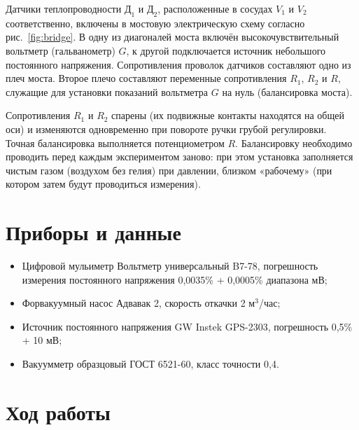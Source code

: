 \documentclass[a4paper,12pt]{article}
\begin{document}
        
        Датчики теплопроводности $\text{Д}_1$ и $\text{Д}_2$, расположенные в сосудах $V_1$ и $V_2$ соответственно, включены в мостовую электрическую схему согласно рис.~\ref{fig:bridge}. В одну из диагоналей моста включён высокочувствительный вольтметр (гальванометр) $G$, к другой подключается источник небольшого постоянного напряжения. Сопротивления проволок датчиков составляют одно из плеч моста. Второе плечо составляют переменные сопротивления $R_1$, $R_2$ и $R$, служащие для установки показаний вольтметра $G$ на нуль (балансировка моста).
        
        Сопротивления $R_1$ и $R_2$ спарены (их подвижные контакты находятся на общей оси) и изменяются одновременно при повороте ручки грубой регулировки. Точная балансировка выполняется потенциометром $R$. Балансировку необходимо проводить перед каждым экспериментом заново: при этом установка заполняется чистым газом (воздухом без гелия) при давлении, близком «рабочему» (при котором затем будут проводиться измерения).

        \section{Приборы и данные}

        \begin{itemize}
            \item Цифровой мульиметр Вольтметр универсальный B7-78, погрешность измерения постоянного напряжения 0,0035\% + 0,0005\% диапазона мВ;
            \item Форвакуумный насос Адвавак 2, скорость откачки 2 м$^3$/час;
            \item Источник постоянного напряжения GW Instek GPS-2303, погрешность 0,5\% + 10 мВ;
            \item Вакуумметр образцовый ГОСТ 6521-60, класс точности 0,4.
        \end{itemize}
        \newpage
        \section{Ход работы}
\end{document}
